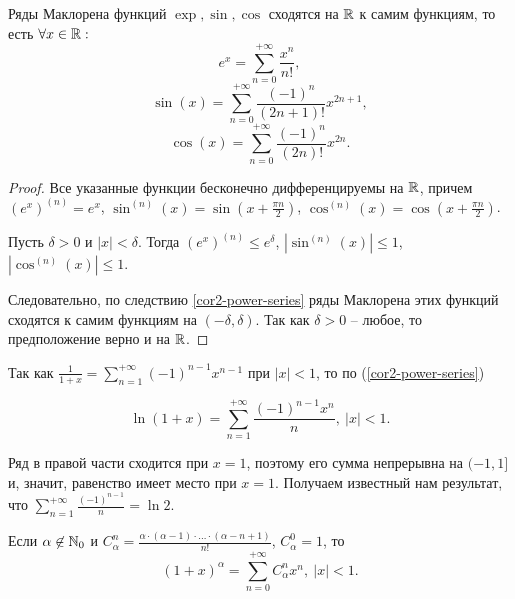 \begin{corollary}
    Ряды Маклорена функций $\exp, \sin, \cos$ сходятся на $\mathbb{R}$ к самим функциям, то есть $\forall x \in \mathbb{R}:$
    \[e^{x} = \sum_{n = 0}^{+\infty} \frac{x^{n}}{n!},\]
    \[\sin(x) = \sum_{n = 0}^{+\infty} \frac{(-1)^{n}}{(2n+1)!}x^{2n + 1},\]
    \[\cos(x) = \sum_{n = 0}^{+\infty} \frac{(-1)^{n}}{(2n)!}x^{2n}.\]
\end{corollary}

\begin{proof}
    Все указанные функции бесконечно дифференцируемы на $\mathbb{R}$, причем $(e^x)^{(n)} = e^x$, $\sin^{(n)}(x) = \sin(x + \frac{\pi n}{2})$, $\cos^{(n)}(x) = \cos(x + \frac{\pi n}{2})$.

    Пусть $\delta > 0$ и $|x| < \delta$. Тогда $(e^x)^{(n)} \leq e^{\delta}$, $|\sin^{(n)}(x)| \leq 1$, $|\cos^{(n)}(x)| \leq 1$.

    Следовательно, по следствию \ref{cor2-power-series} ряды Маклорена этих функций сходятся к самим функциям на $(-\delta, \delta)$. Так как $\delta > 0$ -- любое, то предположение верно и на $\mathbb{R}$.
\end{proof}

\begin{example}
    Так как $\frac{1}{1 + x} = \sum_{n = 1}^{+\infty} (-1)^{n - 1}x^{n - 1}$ при $|x| < 1$, то по (\ref{cor2-power-series})
    
    \[\ln(1 + x) = \sum_{n = 1}^{+\infty}\frac{(-1)^{n - 1} x^{n}}{n}, \ |x| < 1.\]

    Ряд в правой части сходится при $x = 1$, поэтому его сумма непрерывна на $(-1, 1]$ и, значит, равенство имеет место при $x = 1$. Получаем известный нам результат, что $\sum_{n = 1}^{+\infty}\frac{(-1)^{n - 1}}{n} = \ln 2$.
\end{example}

\begin{theorem}
    Если $\alpha \not\in \mathbb{N}_{0}$ и $C_{\alpha}^{n} = \frac{\alpha \cdot (\alpha - 1) \cdot \ldots \cdot (\alpha - n + 1)}{n!}$, $C_{\alpha}^{0} = 1$, то 
    \[(1 + x)^{\alpha} = \sum_{n = 0}^{+\infty} C_{\alpha}^{n}x^{n}, \ |x| < 1.\]
\end{theorem}

